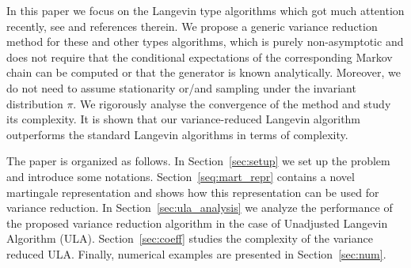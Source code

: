 \documentclass[preprint]{imsart}
\begin{document}
\par
In this paper we focus on the  Langevin type algorithms which got much attention recently, see \cite{dalalyan2017theoretical,durmus:moulines:2017, MR2353037, MR3861816, MR2977986} and references therein. We propose  a generic variance reduction method for these and other types algorithms, which is purely non-asymptotic and does not require that    the conditional expectations of the corresponding Markov chain can be computed  or that the generator is known analytically. Moreover, we do not need to assume stationarity or/and sampling under the invariant distribution \(\pi.\) We rigorously analyse the convergence of the method and study its complexity. It is shown that  our variance-reduced Langevin algorithm outperforms the standard Langevin algorithms in terms of complexity.
\par
The paper is organized as follows.  In Section~\ref{sec:setup} we set up the problem and introduce some notations. Section~\ref{seq:mart_repr} contains a novel martingale representation and shows how this representation can be used for variance reduction. In Section~\ref{sec:ula_analysis} we analyze the performance of the proposed variance reduction algorithm in the case of Unadjusted Langevin Algorithm (ULA). Section~\ref{sec:coeff} studies the complexity of the variance reduced ULA. Finally, numerical examples are presented in Section~\ref{sec:num}.
\end{document}
